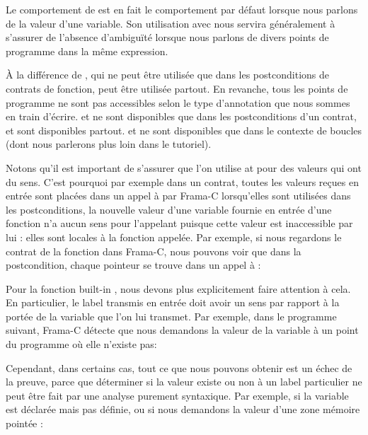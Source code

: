 \begin{Information}
Le comportement de  est en fait le comportement par défaut lorsque
nous parlons de la valeur d'une variable. Son utilisation avec  nous
servira généralement à s'assurer de l'absence d’ambiguïté lorsque nous parlons
de divers points de programme dans la même expression.
\end{Information}


À la différence de , qui ne peut être utilisée que dans les
postconditions de contrats de fonction,  peut être utilisée partout.
En revanche, tous les points de programme ne sont pas accessibles selon le type
d'annotation que nous sommes en train d'écrire.  et  ne sont
disponibles que dans les postconditions d'un contrat,  et 
sont disponibles partout.  et  ne sont
disponibles que dans le contexte de boucles (dont nous parlerons plus loin dans
le tutoriel).


Notons qu'il est important de s'assurer que l'on utilise  at
 pour des valeurs qui ont du sens. C'est pourquoi par
exemple dans un contrat, toutes les valeurs reçues en entrée sont placées dans un
appel à  par Frama-C lorsqu'elles sont utilisées dans
les postconditions, la nouvelle valeur d'une variable fournie en entrée d'une
fonction n'a aucun sens pour l'appelant puisque cette valeur est inaccessible par
lui : elles sont locales à la fonction appelée. Par exemple, si nous regardons le
contrat de la fonction  dans Frama-C, nous pouvons voir que dans
la postcondition, chaque pointeur se trouve dans un appel à  :




Pour la fonction built-in , nous devons plus
explicitement faire attention à cela. En particulier, le label transmis en entrée
doit avoir un sens par rapport à la portée de la variable que l'on lui transmet.
Par exemple, dans le programme suivant, Frama-C détecte que nous demandons la valeur
de la variable  à un point du programme où elle n'existe pas:






Cependant, dans certains cas, tout ce que nous pouvons obtenir est un échec de
la preuve, parce que déterminer si la valeur existe ou non à un label particulier
ne peut être fait par une analyse purement syntaxique. Par exemple, si la variable
est déclarée mais pas définie, ou si nous demandons la valeur d'une zone mémoire
pointée :


